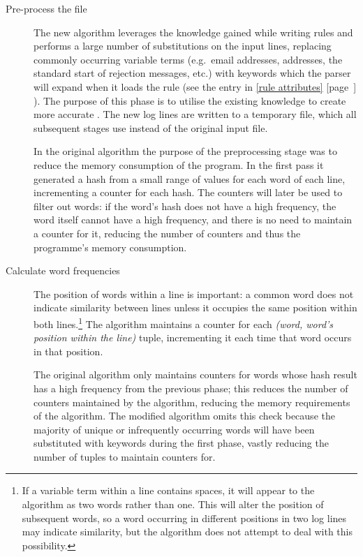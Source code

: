 \documentclass[a4paper,12pt,draft]{article}
\newcommand{\refwithpage}[1]{%
    \empty{}\ref{#1} [page~\pageref{#1}]%
}
\newcommand{\sectionref}[1]{%
    \textsection{}\refwithpage{#1}%
}
\begin{document}
\begin{description}

    \item [Pre-process the file]  The new algorithm leverages the knowledge
        gained while writing rules and performs a large number of
        substitutions on the input lines, replacing commonly occurring
        variable terms (e.g.\ email addresses, \IP{} addresses, the
        standard start of rejection messages, etc.) with \regex{} keywords
        which the parser will expand when it loads the rule (see the
        \regex{} entry in \sectionref{rule attributes}).  The purpose of
        this phase is to utilise the existing knowledge to create more
        accurate \regexes{}.  The new log lines are written to a temporary
        file, which all subsequent stages use instead of the original input
        file.

        In the original algorithm the purpose of the preprocessing stage
        was to reduce the memory consumption of the program.  In the first
        pass it generated a hash from a small range of values for each word
        of each line, incrementing a counter for each hash.  The counters
        will later be used to filter out words: if the word's hash does not
        have a high frequency, the word itself cannot have a high
        frequency, and there is no need to maintain a counter for it,
        reducing the number of counters and thus the programme's memory
        consumption.

    \item [Calculate word frequencies]  The position of words within a line
        is important: a common word does not indicate similarity between
        lines unless it occupies the same position within both
        lines.\footnote{If a variable term within a line contains spaces,
        it will appear to the algorithm as two words rather than one.  This
        will alter the position of subsequent words, so a word occurring in
        different positions in two log lines may indicate similarity, but
        the algorithm does not attempt to deal with this possibility.}  The
        algorithm maintains a counter for each \textit{(word, word's
        position within the line)\/} tuple, incrementing it each time that
        word occurs in that position.

        The original algorithm only maintains counters for words whose hash
        result has a high frequency from the previous phase; this reduces
        the number of counters maintained by the algorithm, reducing the
        memory requirements of the algorithm.  The modified algorithm omits
        this check because the majority of unique or infrequently occurring
        words will have been substituted with keywords during the first
        phase, vastly reducing the number of tuples to maintain counters
        for.


\end{description}
\end{document}

